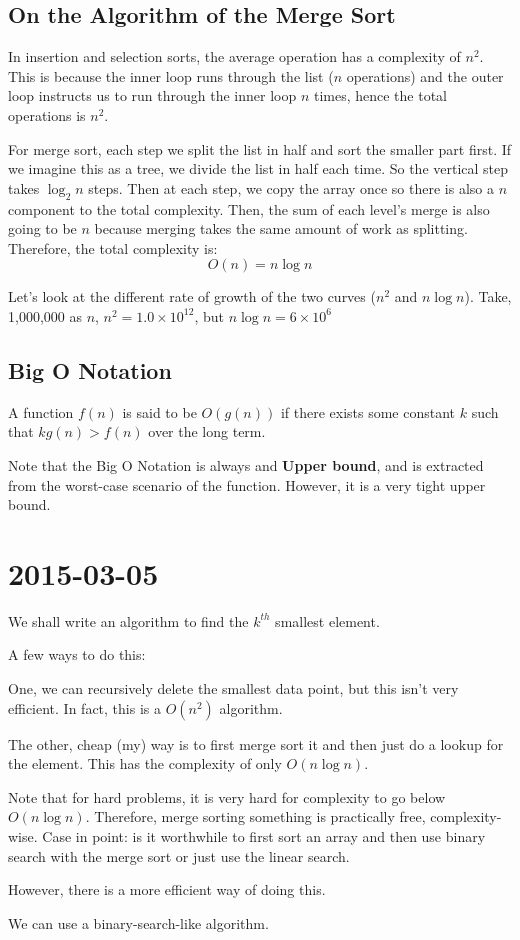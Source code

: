 \documentclass [12 pt, twoside] {article}
\begin{document}
\subsection{On the Algorithm of the Merge Sort}
In insertion and selection sorts, the average operation has a complexity of
$n^2$. This is because the inner loop runs through the list ($n$ operations)
and the outer loop instructs us to run through the inner loop $n$ times, hence
the total operations is $n^2$.

For merge sort, each step we split the list in half and sort the smaller part
first. If we imagine this as a tree, we divide the list in half each time. So
the vertical step takes $\log_2{n}$ steps. Then at each step, we copy the array
once so there is also a $n$ component to the total complexity. Then, the sum
of each level's merge is also going to be $n$ because merging takes the same
amount of work as splitting. Therefore, the total complexity is:
$$O(n) = n\log{n}$$

Let's look at the different rate of growth of the two curves ($n^2$ and
$n\log{n}$). Take, 1,000,000 as $n$, $n^2 = 1.0 \times 10^{12}$, but $n\log{n} = 6
\times 10^{6}$

\subsection{Big O Notation}
A function $f(n)$ is said to be $O(g(n))$ if there exists some constant $k$
such that $kg(n) > f(n)$ over the long term.

Note that the Big O Notation is always and \textbf{Upper bound}, and is
extracted from the worst-case scenario of the function. However, it is a very
tight upper bound.

\section{2015-03-05}
We shall write an algorithm to find the $k^{th}$ smallest element.

A few ways to do this:

One, we can recursively delete the smallest data point, but this isn't very
efficient. In fact, this is a $O(n^2)$ algorithm.

The other, cheap (my) way is to first merge sort it and then just do a lookup
for the element. This has the complexity of only $O(n\log{n})$.

Note that for hard problems, it is very hard for complexity to go below
$O(n\log{n})$. Therefore, merge sorting something is practically free,
complexity-wise. Case in point: is it worthwhile to first sort an array and
then use binary search with the merge sort or just use the linear search.

However, there is a more efficient way of doing this.

We can use a binary-search-like algorithm. 
\end{document}
